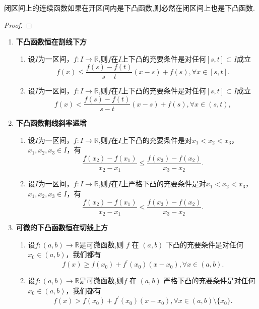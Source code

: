 \documentclass[../../main.tex]{subfiles}
\begin{document}
\begin{proposition}\label{proposition:开区间下凸闭区间连续的函数在闭区间上仍然下凸}
闭区间上的连续函数如果在开区间内是下凸函数,则必然在闭区间上也是下凸函数.
\end{proposition}
\begin{proof}

\end{proof}

\begin{proposition}[下凸函数的基本性质]\label{proposition:下凸函数的基本性质}
\begin{enumerate}
\item\label{下凸函数恒在割线下方} \textbf{下凸函数恒在割线下方}
\begin{enumerate}[(1)]
\item 设\(I\)为一区间，\(f:I\to\mathbb{R}\),则\(f\)在\(I\)上下凸的充要条件是对任何\([s,t]\subset I\)成立
\[
f(x)\leqslant\frac{f(s)-f(t)}{s - t}(x - s)+f(s),\forall x\in[s,t].
\]

\item 设\(I\)为一区间，\(f:I\to\mathbb{R}\),则\(f\)在\(I\)上下凸的充要条件是对任何\([s,t]\subset I\)成立
\[
f(x)<\frac{f(s)-f(t)}{s - t}(x - s)+f(s),\forall x\in(s,t),
\]
\end{enumerate}

\item\label{下凸函数割线斜率递增} \textbf{下凸函数割线斜率递增}
\begin{enumerate}[(1)]
\item 设\(I\)为一区间，\(f:I\to\mathbb{R}\),则\(f\)在\(I\)上下凸的充要条件是对\(x_1 < x_2 < x_3\)，\(x_1,x_2,x_3\in I\)，有
\[
\frac{f(x_2)-f(x_1)}{x_2 - x_1}\leqslant\frac{f(x_3)-f(x_2)}{x_3 - x_2}.
\]

\item 设\(I\)为一区间，\(f:I\to\mathbb{R}\),则\(f\)在\(I\)上严格下凸的充要条件是对\(x_1 < x_2 < x_3\)，\(x_1,x_2,x_3\in I\)，有
\[
\frac{f(x_2)-f(x_1)}{x_2 - x_1}<\frac{f(x_3)-f(x_2)}{x_3 - x_2}.
\]
\end{enumerate}

\item\label{可微的下凸函数恒在切线上方} \textbf{可微的下凸函数恒在切线上方}
\begin{enumerate}[(1)]
\item 设\(f:(a,b)\to\mathbb{R}\)是可微函数,则 \(f\) 在 \((a,b)\) 下凸的充要条件是对任何 \(x_{0}\in(a,b)\)，我们都有
\[
f(x)\geqslant f(x_{0})+f^{\prime}(x_{0})(x - x_{0}),\forall x\in(a,b).
\]

\item 设\(f:(a,b)\to\mathbb{R}\)是可微函数,则\(f\) 在 \((a,b)\) 严格下凸的充要条件是对任何 \(x_{0}\in(a,b)\)，我们都有
\[
f(x)> f(x_{0})+f^{\prime}(x_{0})(x - x_{0}),\forall x\in(a,b)\setminus\{x_{0}\}.
\]
\end{enumerate}
\end{enumerate}
\end{proposition}
\end{document}
